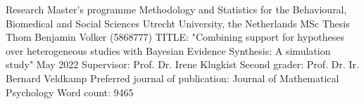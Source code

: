 
\thispagestyle{empty}

\begin{large}
\noindent Research Master's programme 
Methodology and Statistics for the Behavioural, Biomedical and Social Sciences \newline
Utrecht University, the Netherlands \newline
\newline
\newline
\newline
\newline
MSc Thesis Thom Benjamin Volker (5868777) 
\newline
TITLE: "Combining support for hypotheses over heterogeneous studies with Bayesian Evidence Synthesis: A simulation study" 
\newline
May 2022 
\newline
\newline
\newline
\newline
\newline
Supervisor:\newline
Prof. Dr. Irene Klugkist \newline
\newline
\newline
Second grader: \newline
Prof. Dr. Ir. Bernard Veldkamp
\newline
\newline
\newline
\newline
Preferred journal of publication: Journal of Mathematical Psychology 
\newline
Word count: 9465
\newline
\end{large}
\addtocounter{page}{-1}
\clearpage
\pagebreak